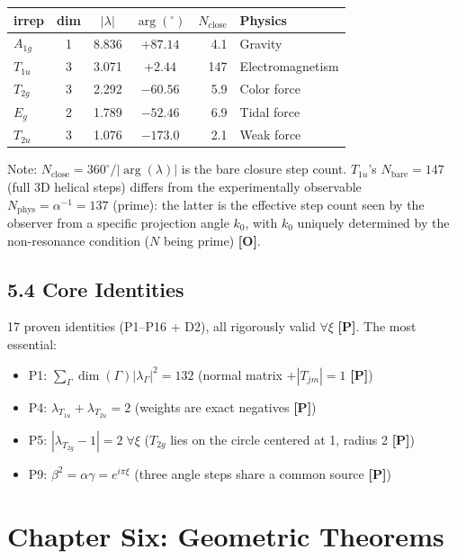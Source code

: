 \documentclass[11pt,a4paper]{article}
\newcommand{\gradeP}{\textbf{[P]}}
\newcommand{\gradeO}{\textbf{[O]}}
\begin{document}
\begin{center}
\begin{tabular}{lcccrl}
\toprule
irrep & dim & $|\lambda|$ & $\arg({}^\circ)$ & $N_{\mathrm{close}}$ & Physics \\
\midrule
$A_{1g}$ & 1 & 8.836 & $+87.14$ & 4.1 & Gravity \\
$T_{1u}$ & 3 & 3.071 & $+2.44$ & 147 & Electromagnetism \\
$T_{2g}$ & 3 & 2.292 & $-60.56$ & 5.9 & Color force \\
$E_g$ & 2 & 1.789 & $-52.46$ & 6.9 & Tidal force \\
$T_{2u}$ & 3 & 1.076 & $-173.0$ & 2.1 & Weak force \\
\bottomrule
\end{tabular}
\end{center}

Note: $N_{\mathrm{close}} = 360^\circ/|\arg(\lambda)|$ is the bare closure step count. $T_{1u}$'s $N_{\mathrm{bare}}=147$ (full 3D helical steps) differs from the experimentally observable $N_{\mathrm{phys}}=\alpha^{-1}=137$ (prime): the latter is the effective step count seen by the observer from a specific projection angle $k_0$, with $k_0$ uniquely determined by the non-resonance condition ($N$ being prime) \gradeO.

\subsection{5.4 Core Identities}

17 proven identities (P1--P16 + D2), all rigorously valid $\forall\xi$ \gradeP. The most essential:
\begin{itemize}[nosep]
\item P1: $\sum_\Gamma \dim(\Gamma)|\lambda_\Gamma|^2 = 132$ (normal matrix $+ |T_{jm}|=1$ \gradeP)
\item P4: $\lambda_{T_{1u}}+\lambda_{T_{2u}}=2$ (weights are exact negatives \gradeP)
\item P5: $|\lambda_{T_{2g}}-1|=2\;\forall\xi$ ($T_{2g}$ lies on the circle centered at 1, radius 2 \gradeP)
\item P9: $\beta^2 = \alpha\gamma = e^{i\pi\xi}$ (three angle steps share a common source \gradeP)
\end{itemize}

\section{Chapter Six: Geometric Theorems}\label{sec:ch6}
\end{document}
